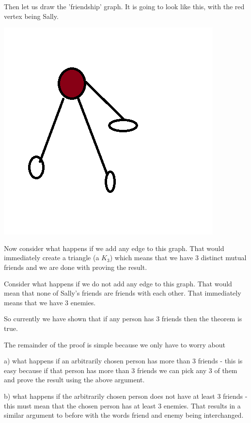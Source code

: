 \documentclass[12pt]{article}
\begin{document}
Then let us draw the 'friendship' graph. It is going to look like this, with the red vertex being Sally.

\includegraphics[scale=0.5]{./img/friends.png}

Now consider what happens if we add any edge to this graph. That would immediately create a triangle (a $K_3$) which means that we have 3 distinct mutual friends and we are done with proving the result.

Consider what happens if we do not add any edge to this graph. That would mean that none of Sally's friends are friends with each other. That immediately means that we have 3 enemies. 

So currently we have shown that if any person has 3 friends then the theorem is true. 

The remainder of the proof is simple because we only have to worry about  

a) what happens if an arbitrarily chosen person has more than 3 friends - this is easy because if that person has more than 3 friends we can pick any 3 of them and prove the result using the above argument.

b) what happens if the arbitrarily chosen person does not have at least 3 friends - this must mean that the chosen person has at least 3 enemies. That results in a similar argument to before with the words friend and enemy being interchanged.
\end{document}
